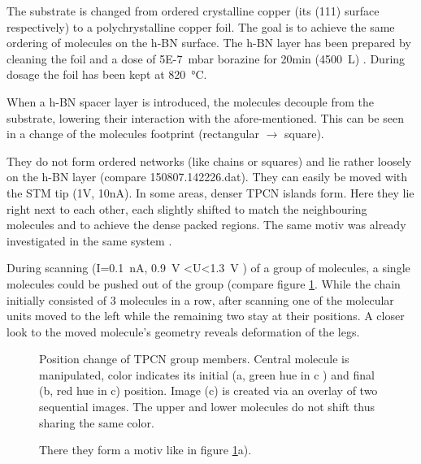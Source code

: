 The substrate is changed from ordered crystalline copper (its (111) surface respectively) to a polychrystalline copper foil. The goal is to achieve the same ordering of molecules on the h-BN surface. The h-BN layer has been prepared by cleaning the foil and a dose of \SI{5E-7}{mbar} borazine for 20min (4500 \,L) . During dosage the foil has been kept at \SI{820}{\degreeCelsius}.

When a h-BN spacer layer is introduced, the molecules decouple from the substrate, lowering their interaction with the afore-mentioned. This can be seen in a change of the molecules footprint (rectangular $\rightarrow$ square).

They do not form ordered networks (like chains or squares) and lie rather loosely on the h-BN layer (compare 150807.142226.dat). They can easily be moved with the STM tip (1V, 10nA). In some areas, denser TPCN islands form. Here they lie right next to each other, each slightly shifted to match the neighbouring molecules and to achieve the dense packed regions. The same motiv was already investigated in the same system \cite{urgel_controlling_2015}.

During scanning (I=\SI{0.1}{\nA}, \SI{0.9}{\V} <U<\SI{1.3}{\V} ) of a group of molecules, a single molecules could be pushed out of the group (compare figure \ref{fig:TPCN-manipulation}. While the chain initially consisted of 3 molecules in a row, after scanning one of the molecular units moved to the left while the remaining two stay at their positions. A closer look to the moved molecule's geometry reveals deformation of the legs.

\begin{figure}[!h]
 \centering
 \caption{Position change of TPCN group members. Central molecule is manipulated, color indicates its initial (a, green hue in c ) and final (b, red hue in c) position. Image (c) is created via an overlay of two sequential images. The upper and lower molecules do not shift thus sharing the same color.}
 \label{fig:TPCN-manipulation}
\end{figure}

\newpage
\begin{figure}[!h]
 \centering
\caption{There they form a motiv like in figure \ref{fig:TPCN-manipulation}a).}
\end{figure}

